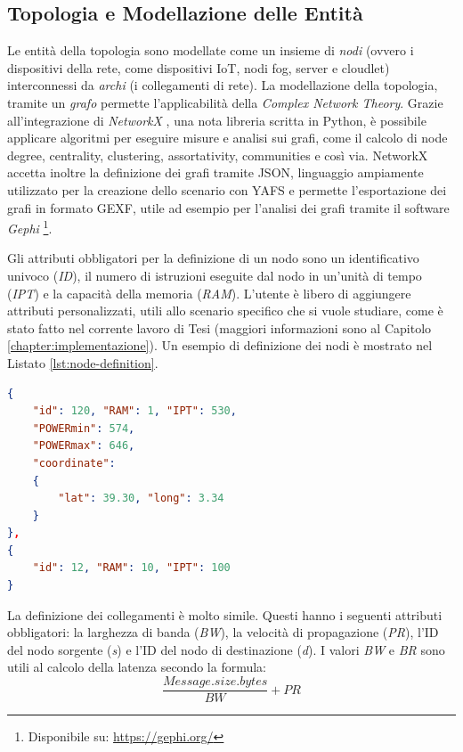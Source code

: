 \subsection{Topologia e Modellazione delle Entità}

Le entità della topologia sono modellate come un insieme di \textit{nodi} (ovvero i dispositivi della rete, come dispositivi IoT, nodi fog, server e cloudlet) interconnessi da \textit{archi} (i collegamenti di rete). La modellazione della topologia, tramite un \textit{grafo} permette l'applicabilità della \textit{Complex Network Theory}. Grazie all'integrazione di \textit{NetworkX}  \cite{NetworkX}, una nota libreria scritta in Python, è possibile applicare algoritmi per eseguire misure e analisi sui grafi, come il calcolo di node degree, centrality, clustering, assortativity, communities e così via. NetworkX accetta inoltre la definizione dei grafi tramite JSON, linguaggio ampiamente utilizzato per la creazione dello scenario con YAFS e permette l'esportazione dei grafi in formato GEXF, utile ad esempio per l'analisi dei grafi tramite il software \textit{Gephi} \footnote{Disponibile su: \url{https://gephi.org/}}.

Gli attributi obbligatori per la definizione di un nodo sono un identificativo univoco (\textit{ID}), il numero di istruzioni eseguite dal nodo in un'unità di tempo (\textit{IPT}) e la capacità della memoria (\textit{RAM}). L'utente è libero di aggiungere attributi personalizzati, utili allo scenario specifico che si vuole studiare, come è stato fatto nel corrente lavoro di Tesi (maggiori informazioni sono al Capitolo \ref{chapter:implementazione}). Un esempio di definizione dei nodi è mostrato nel Listato \ref{lst:node-definition}. 
\begin{lstlisting}[language=json, caption={Definizione di due nodi Fog utilizzando la rappresentazione JSON \cite{YAFSSimulator}}, captionpos=b, label={lst:node-definition}]
{
	"id": 120, "RAM": 1, "IPT": 530,
	"POWERmin": 574,
	"POWERmax": 646,
	"coordinate": 
	{
		"lat": 39.30, "long": 3.34
	}
},
{
	"id": 12, "RAM": 10, "IPT": 100
}
\end{lstlisting}

La definizione dei collegamenti è molto simile. Questi hanno i seguenti attributi obbligatori: la larghezza di banda (\textit{BW}), la velocità di propagazione (\textit{PR}), l'ID del nodo sorgente (\textit{s}) e l'ID del nodo di destinazione (\textit{d}). I valori \textit{BW} e \textit{BR} sono utili al calcolo della latenza secondo la formula:
$$\frac{Message.size.bytes}{BW} + PR$$

